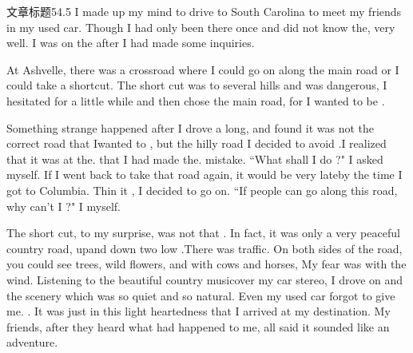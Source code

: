 \documentclass[color=orange,openany]{textbook-cn}
\begin{document}
\begin{Appendix}
\begin{Cloze}{文章标题}{5}{4.5}
\setcounter{wxcounter}{1}
	I made up my mind to drive to South Carolina to meet my friends in my used car. Though I had only been there once \wx and did not know the, \wx very well. I was on the \wx after I had made some inquiries.\par
	At Ashvelle, there was a crossroad where I could go on along the main road or I could take a shortcut. The short cut was to \wx several hills and was dangerous, I hesitated for a little while and then chose the main road, for I wanted to be \wx.\par
	Something strange happened after I drove a long, \wx and found it was not the correct road that Iwanted to \wx, but the hilly road I decided to avoid .I realized that it was at the. \wx that I had made the. \wx mistake. ``What shall I do ?" I asked myself. If I went back to take that road again, it would be very lateby the time I got to Columbia. Thin it \wx, I decided to go on. ``If \wx people can go along this road, why can't I ?" I \wx myself.\par
	The short cut, to my surprise, was not that \wx. In fact, it was only a very peaceful country road, \wx upand down two low \wx.There was \wx traffic. On both sides of the road, you could see trees, wild flowers, and \wx{} with cows and horses, My fear was \wx with the wind. Listening to the beautiful country musicover my car stereo, I drove on and \wx the scenery which was so quiet and so natural. Even my used car forgot to give me. \wx. It was just in this light heartedness that I arrived at my destination. My friends, after they heard what had happened to me, all said it sounded like an adventure.
\begin{QsNum}
\item {}
\item {}
\item {}
\item {}
\item {}
\item {}
\item {}
\item {}
\item {}
\item {}

\end{QsNum}
\end{Cloze}
\end{Appendix}
\end{document}
